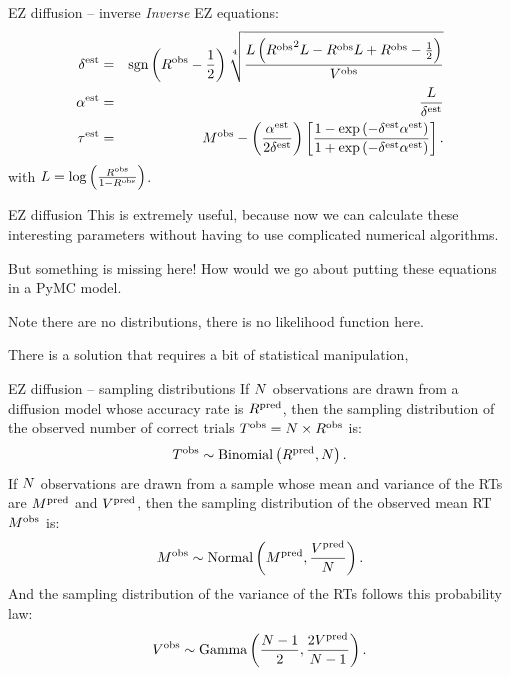 \documentclass[aspectratio=169]{beamer}
\begin{document}
\begin{frame}{EZ diffusion -- inverse}
\emph{Inverse} EZ equations:
\begin{eqnarray}
    \EstDrift &=& \sign{\ObservedAccuracyRate - \frac{1}{2}} \sqrt[\Huge{4}]{\frac{\LogitAccuracy\left(\ObservedAccuracyRate^2 \LogitAccuracy - \ObservedAccuracyRate   \LogitAccuracy + \ObservedAccuracyRate - \frac{1}{2}\right)}{\ObservedVariance}}\\
    \EstBound &=& \frac{\LogitAccuracy}{\EstDrift}\\
    \EstNondecision &=& \ObservedMean - \left(\frac{\EstBound}{2\EstDrift}\right) \left[\frac{1-\text{exp}\left({-\EstDrift\EstBound}\right)}{1+\text{exp}\left({-\EstDrift\EstBound}\right)}\right].
\end{eqnarray}
with $L = \log\left(\frac{{{R}^{\text{obs}}}}{1-{{R}^{\text{obs}}}}\right)$.
\end{frame}





\begin{frame}{EZ diffusion}
This is extremely useful, because now we can calculate these interesting parameters without having to use complicated numerical algorithms.\pause

But something is missing here!  How would we go about putting these equations in a PyMC model.\pause

Note there are no distributions, there is no likelihood function here.\pause

There is a solution that requires a bit of statistical manipulation,
\end{frame}


\begin{frame}{EZ diffusion -- sampling distributions}
If $N$ observations are drawn from a diffusion model whose accuracy rate is ${{{R}^{\text{pred}}}}$, then the sampling distribution of the observed number of correct trials ${{T}^{\text{obs}}} = N \times {{R}^{\text{obs}}}$ is:
\begin{equation}
    {{T}^{\text{obs}}} \sim \text{Binomial}\left({{{R}^{\text{pred}}}},N\right).\label{eq:accuracy}
\end{equation}\pause
If $N$ observations are drawn from a sample whose mean and variance of the RTs are ${{{M}^{\text{pred}}}}$ and ${{{V}^{\text{pred}}}}$, then the sampling distribution of the observed mean RT ${{M}^{\text{obs}}}$ is:
\begin{equation}
    {{M}^{\text{obs}}} \sim \text{Normal}\left({{{M}^{\text{pred}}}},\frac{{{{V}^{\text{pred}}}}}{N}\right).\label{eq:mean}
\end{equation}\pause
And the sampling distribution of the variance of the RTs follows this probability law:
\begin{equation}
    {{V}^{\text{obs}}} \sim \text{Gamma}\left(\frac{N-1}{2}, \frac{2{{{V}^{\text{pred}}}}}{N-1}\right).
    \label{eq:var}
\end{equation}
\end{frame}
\end{document}
